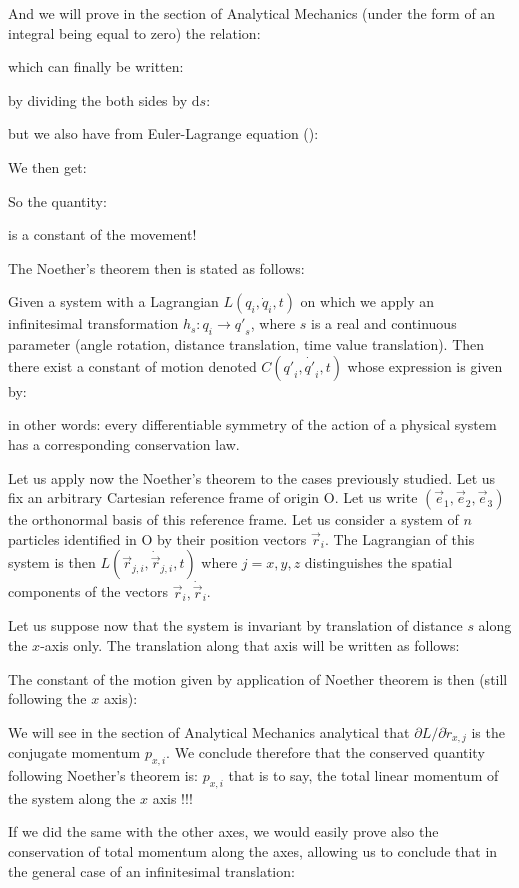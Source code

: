 	And we will prove in the section of Analytical Mechanics (under the form of an integral being equal to zero) the relation:
	
	which can finally be written:
	
	by dividing the both sides by $\mathrm{d}s$:
	
	but we also have from Euler-Lagrange equation ():
	
	We then get:
	
	So the quantity:
	
	is a constant of the movement!
	
	The Noether's theorem then is stated as follows:
	
	Given a system with a Lagrangian $L(q_i,\dot{q}_i,t)$ on which we apply an infinitesimal transformation $h_s:q_i\rightarrow {q'}_s$, where $s$ is a real and continuous parameter (angle rotation, distance translation, time value translation). Then there exist a constant of motion denoted $C({q'}_i,\dot{q'}_i,t)$ whose expression is given by:
	
	in other words:  every differentiable symmetry of the action of a physical system has a corresponding conservation law.
	
	Let us apply now the Noether's theorem to the cases previously studied. Let us fix an arbitrary Cartesian  reference frame of origin O. Let us write $(\vec{e}_1,\vec{e}_2,\vec{e}_3)$ the orthonormal basis of this reference frame. Let us consider a system of $n$ particles identified in O by their position vectors $\vec{r}_i$. The Lagrangian of this system is then $L(\vec{r}_{j,i},\dot{\vec{r}}_{j,i},t)$ where $j=x,y,z$ distinguishes the spatial components of the vectors $\vec{r}_i,\dot{\vec{r}}_i$.
	
	Let us suppose now that the system is invariant by translation of distance $s$ along the $x$-axis only. The translation along that axis will be written as follows:
	
	The constant of the motion given by application of Noether theorem is then (still following the $x$ axis):
	
	We will see in the section of Analytical Mechanics analytical that $\partial L/\partial \dot{r}_{x,j}$ is the conjugate momentum $p_{x,i}$. We conclude therefore that the conserved quantity following Noether's theorem is: $p_{x,i}$ that is to say, the total linear momentum of the system along the $x$ axis !!!
	
	If we did the same with the other axes, we would easily prove also the conservation of total momentum along the axes, allowing us to conclude that in the general case of an infinitesimal translation:
	
